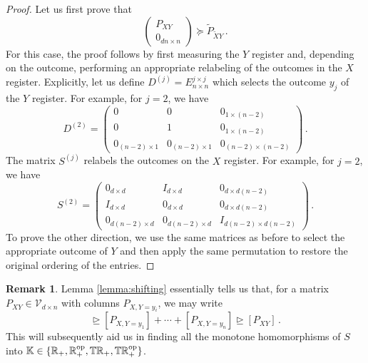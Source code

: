 \documentclass[aps,pra,11pt,onecolumn,nofootinbib,tightenlines]{revtex4-2}
\theoremstyle{definition}
\newtheorem{remark}[theorem]{Remark}
\newcommand{\V}{\mathcal{V}}
\newcommand{\mb}[1]{\mathbb{#1}}
\newcommand{\rgeq}{\trianglerighteq}
\begin{document}
\begin{proof}
Let us first prove that
\begin{equation}
    \begin{pmatrix}
        P_{XY}\\
        0_{dn \times n}
    \end{pmatrix}\succeq\widetilde{P}_{\widetilde{X}Y}\,.
\end{equation}
For this case, the proof follows by first measuring the $Y$ register and, depending on the outcome, performing an appropriate relabeling of the outcomes in the $X$ register.
 Explicitly, let us define $D^{(j)}= E^{j \times j}_{n \times n}$ which selects the outcome $y_j$ of the $Y$ register. For example, for $j=2$, we have
\begin{equation}
    D^{(2)}=\begin{pmatrix}
        0 & 0 & 0_{1 \times (n-2)}  \\
       0 & 1 & 0_{1 \times (n-2)} \\
       0_{(n-2) \times 1} & 0_{(n-2) \times 1} & 0_{(n-2) \times (n-2)} 
    \end{pmatrix} \,.
\end{equation}
The matrix $S^{(j)}$ relabels the outcomes on the $X$ register. For example, for $j=2$, we have 
\begin{equation}
    S^{(2)}=\begin{pmatrix}
        0_{d \times d} & I_{d \times d} & 0_{d \times d(n-2)} \\
        I_{d \times d} & 0_{d \times d} & 0_{d \times d(n-2)} \\
        0_{d(n-2) \times d} & 0_{d(n-2) \times d} & I_{d(n-2) \times d(n-2)}
    \end{pmatrix} \,.
\end{equation}
To prove the other direction, we use the same matrices as before to select the appropriate outcome of $Y$ and then apply the same permutation to restore the original ordering of the entries.
\end{proof}

\begin{remark}\label{rem:SomOfColumns}
Lemma \ref{lemma:shifting} essentially tells us that, for a matrix $P_{XY}\in\V_{d \times n}$ with columns $P_{X,Y=y_i}$, we may write
\begin{equation}
[P_{XY}]\rgeq[P_{X,Y=y_1}]+\cdots+[P_{X,Y=y_n}]\rgeq [P_{XY}] \,.
\end{equation}
This will subsequently aid us in finding all the monotone homomorphisms of $S$ into $\mb K\in\{\mb R_+,\mb R_+^{\rm op},\mb{TR}_+,\mb{TR}_+^{\rm op}\}$.
\end{remark}
\end{document}
